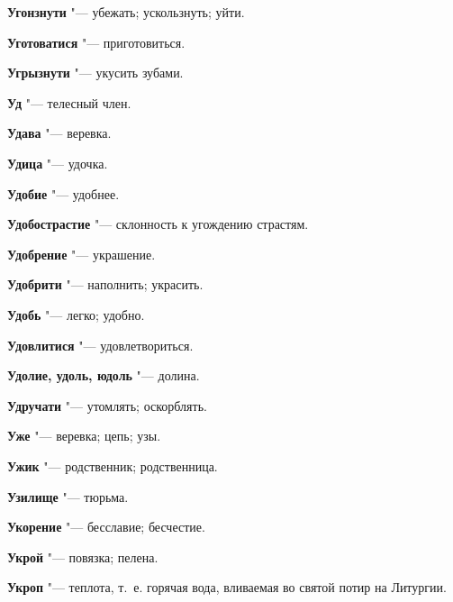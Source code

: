 \begin{mymulticols}{2}
\noindent\textbf{Угонзнути} "--- убежать; ускользнуть; уйти. 




\noindent\textbf{Уготоватися} "--- приготовиться. 




\noindent\textbf{Угрызнути} "--- укусить зубами. 




\noindent\textbf{Уд} "--- телесный член. 




\noindent\textbf{Удава} "--- веревка. 




\noindent\textbf{Удица} "--- удочка. 




\noindent\textbf{Удобие} "--- удобнее. 




\noindent\textbf{Удобострастие} "--- склонность к угождению страстям. 




\noindent\textbf{Удобрение} "--- украшение. 




\noindent\textbf{Удобрити} "--- наполнить; украсить. 




\noindent\textbf{Удобь} "--- легко; удобно. 




\noindent\textbf{Удовлитися} "--- удовлетвориться. 




\noindent\textbf{Удолие, удоль, юдоль} "--- долина. 




\noindent\textbf{Удручати} "--- утомлять; оскорблять. 




\noindent\textbf{Уже} "--- веревка; цепь; узы. 




\noindent\textbf{Ужик} "--- родственник; родственница. 




\noindent\textbf{Узилище} "--- тюрьма. 




\noindent\textbf{Укорение} "--- бесславие; бесчестие. 




\noindent\textbf{Укрой} "--- повязка; пелена. 




\noindent\textbf{Укроп} "--- теплота, т.~е. горячая вода, вливаемая во святой потир на Литургии. 





\end{mymulticols}
